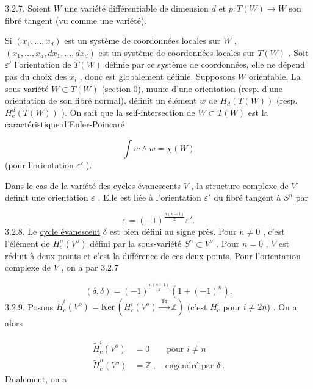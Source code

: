 3.2.7. Soient $W$ une variété différentiable de dimension $d$ et $p : T(W) \to W$ son fibré tangent (vu comme une variété).



Si $(x_1,\ldots,x_d)$ est un système de coordonnées locales sur $W$ , $(x_1,\ldots,x_d, dx_1,\ldots,dx_d)$ est un système de coordonnées locales sur $T(W)$ . Soit $\varepsilon'$ l'orientation de $T(W)$ définie par ce système de coordonnées, elle ne dépend pas du choix des $x_i$ , donc est globalement définie. Supposons $W$ orientable. La sous-variété $W \subset T(W)$ (section 0), munie d'une orientation (resp. d'une orientation de son fibré normal), définit un élément $w$ de $H_d(T(W))$ (resp. $H^d_c(T(W))$ ). On sait que la self-intersection de $W \subset T(W)$ est la caractéristique d'Euler-Poincaré

\begin{equation*}
\int w \wedge w = \chi(W)
\end{equation*}
(pour l'orientation $\varepsilon'$ ).

Dans le cas de la variété des cycles évanescents $V$ , la structure complexe de $V$ définit une orientation $\varepsilon$ . Elle est liée à l'orientation $\varepsilon'$ du fibré tangent à $S^n$ par

\begin{equation*}
\varepsilon = (-1)^{\frac{n(n-1)}{2}} \varepsilon' .
\end{equation*}
3.2.8. Le \underline{cycle évanescent} $\delta$ est bien défini au signe près. Pour $n \neq 0$ , c'est l'élément de $H^n_c(V^o)$ défini par la sous-variété $S^n \subset V^o$ . Pour $n = 0$ , $V$ est réduit à deux points et c'est la différence de ces deux points. Pour l'orientation complexe de $V$ , on a par 3.2.7

\begin{equation}\tag{3.2.8.1}
(\delta, \delta) = (-1)^{\frac{n(n-1)}{2}} (1 + (-1)^n) .
\end{equation}
3.2.9. Posons $\widetilde{H}^i_c(V^o) = \mathrm{Ker}\, (H^i_c(V^o) \xrightarrow{\ \mathrm{Tr}\ } \mathbb{Z})$ (c'est $H^i_c$ pour $i \neq 2n$) . On a alors

\begin{equation*}
\begin{aligned} \widetilde{H}^i_c(V^o) &= 0 \qquad \text{pour } i \neq n \\ \widetilde{H}^n_c(V^o) &= \mathbb{Z} \ , \quad \text{engendré par } \delta \ . \end{aligned}
\end{equation*}
Dualement, on a

